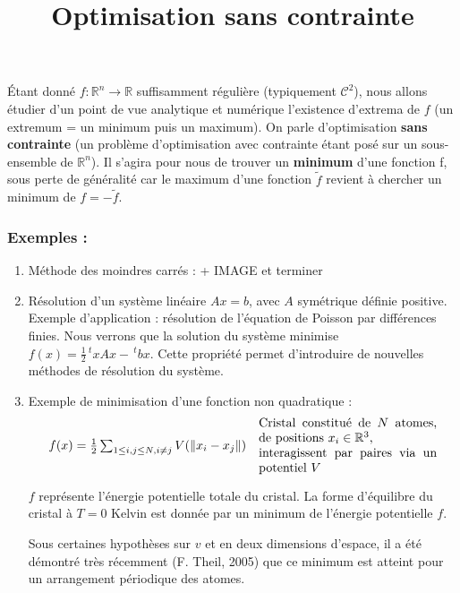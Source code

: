\documentclass[a4paper,11pt]{article}
\title{\huge \bfseries Optimisation sans contrainte}
\date{}
\author{}
\newcommand{\R}{\mathbb{R}}
\newcommand{\norm}[1]{\left\lVert#1\right\rVert}
\newcommand{\tpo}[1]{\,^t#1}
\theoremstyle{plain} %
\begin{document}
\maketitle

Étant donné $f : \R^n \longrightarrow \R$ suffisamment régulière (typiquement
$\mathcal{C}^2$), nous allons étudier d'un point de vue analytique et
numérique l'existence d'extrema de $f$ (un extremum = un minimum puis un
maximum). On parle d'optimisation \textbf{sans contrainte} (un problème 
d'optimisation avec contrainte étant posé sur un sous-ensemble de $\R^n$).
Il s'agira pour nous de trouver un \textbf{minimum} d'une fonction f, sous perte
de généralité car le maximum d'une fonction $\tilde{f}$ revient à chercher
un minimum de $f = - \tilde{f}$.

\subsubsection*{Exemples :}

\begin{enumerate}[label=-]
    \item Méthode des moindres carrés : 
        + IMAGE
        et terminer

    \item Résolution d'un système linéaire $Ax=b$, avec $A$ symétrique définie
        positive. Exemple d'application : résolution de l'équation de Poisson
        par différences finies. Nous verrons que la solution du système
        minimise $f(x) = \frac{1}{2} \tpo{x}Ax - \tpo{b}x$. Cette propriété
        permet d'introduire de nouvelles méthodes de résolution du système.

    \item Exemple de minimisation d'une fonction non quadratique :
        \[
            \begin{array}{cc}
                f(x) = \frac{1}{2} \sum_{1\leq i,j\leq N, i\ne j} V(\norm{x_i - x_j}) 
                & 
                \parbox{5cm}{Cristal constitué de $N$ atomes, de positions $x_i \in \R^3$,\\ interagissent par paires via un potentiel $V$}
            \end{array}
        \]
        
        $f$ représente l'énergie potentielle totale du cristal. La forme d'équilibre du
        cristal à $T = 0$ Kelvin est donnée par un minimum de l'énergie potentielle $f$.

        Sous certaines hypothèses sur $v$ et en deux dimensions d'espace, il a été démontré
        très récemment (F. Theil, 2005) que ce minimum est atteint pour un arrangement
        périodique des atomes.
\end{enumerate}
\end{document}
